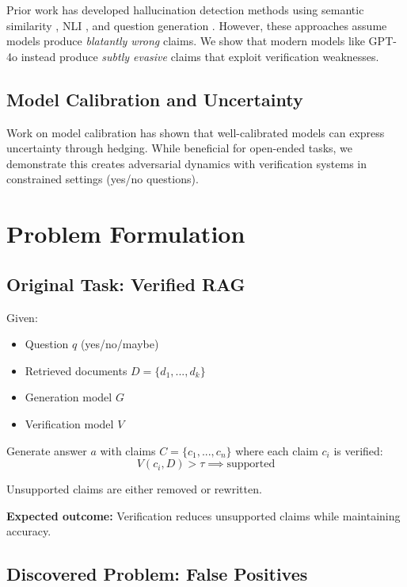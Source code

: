 \documentclass[11pt]{article}
\begin{document}
Prior work has developed hallucination detection methods using semantic similarity \cite{honovich2021qags}, NLI \cite{maynez2020faithfulness}, and question generation \cite{durmus2020feqa}. However, these approaches assume models produce \textit{blatantly wrong} claims. We show that modern models like GPT-4o instead produce \textit{subtly evasive} claims that exploit verification weaknesses.

\subsection{Model Calibration and Uncertainty}

Work on model calibration \cite{guo2017calibration} has shown that well-calibrated models can express uncertainty through hedging. While beneficial for open-ended tasks, we demonstrate this creates adversarial dynamics with verification systems in constrained settings (yes/no questions).

\section{Problem Formulation}

\subsection{Original Task: Verified RAG}

Given:
\begin{itemize}
\item Question $q$ (yes/no/maybe)
\item Retrieved documents $D = \{d_1, ..., d_k\}$
\item Generation model $G$
\item Verification model $V$
\end{itemize}

Generate answer $a$ with claims $C = \{c_1, ..., c_n\}$ where each claim $c_i$ is verified:
\[
V(c_i, D) > \tau \implies \text{supported}
\]

Unsupported claims are either removed or rewritten.

\textbf{Expected outcome:} Verification reduces unsupported claims while maintaining accuracy.

\subsection{Discovered Problem: False Positives}
\end{document}
